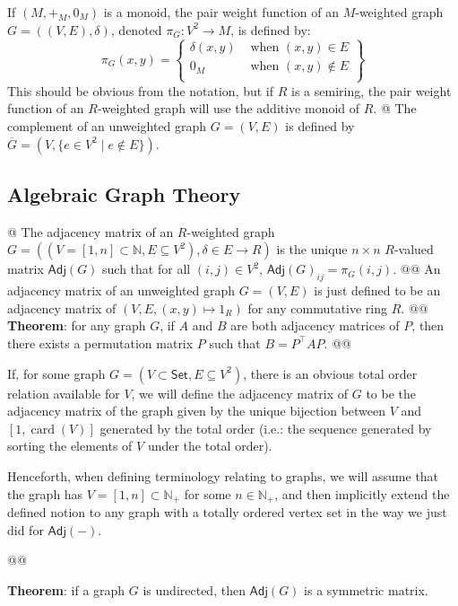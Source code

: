 \documentclass[]{article}
\newcommand{\textbs}[1]{{\sffamily\fontseries{sbc}\selectfont #1}}
\newcommand{\mbb}[1]{\ensuremath{\mathbb{#1}}}     %
\newcommand{\msf}[1]{\ensuremath{\mathsf{#1}}}     %
\newcommand{\catset}[0]{\ensuremath{\mathsf{Set}}}
\DeclareMathOperator{\card}{card}
\newcommand{\define}[1]{\textbs{#1}}
\begin{document}
\begin{refsection}
\begin{easylist}[itemize]
{  If $(M, {+}_M, 0_M)$ is a monoid, the \define{pair weight function} of
  an $M$-weighted graph $G = ((V, E), \delta)$, denoted $\pi_G : V^2 \to M$,
  is defined by:
  \begin{equation*}
  \pi_G(x, y) = \left\{\begin{array}{lr}
  \delta(x, y) & \text{ when } (x, y) \in    E \\
  0_M          & \text{ when } (x, y) \notin E \\
  \end{array}\right\}
  \end{equation*}
  This should be obvious from the notation, but if $R$ is a semiring, the pair
  weight function of an $R$-weighted graph will use the additive monoid of $R$.
}
@ {%
  The \define{complement} of an unweighted graph $G = (V, E)$
  is defined by $\overline{G} = (V, \{e \in V^2 \mid e \notin E\})$.
}
\end{easylist}

\subsection{Algebraic Graph Theory}

\begin{easylist}[itemize]
@ {%
  The \define{adjacency matrix} of an $R$-weighted graph
  $G = ((V = [1, n] \subset \mbb{N}, E \subseteq V^2), \delta \in E \to R)$
  is the unique $n \times n$ $R$-valued matrix $\msf{Adj}(G)$ such that for
  all $(i, j) \in V^2$, ${\msf{Adj}(G)}_{ij} = \pi_G(i, j)$.
}
@@ {%
  An adjacency matrix of an unweighted graph $G = (V, E)$ is just defined to be
  an adjacency matrix of $(V, E, (x, y) \mapsto 1_R)$ for any commutative
  ring $R$.
}
@@ {%
  \textbf{Theorem}: for any graph $G$, if $A$ and $B$ are both adjacency
  matrices of $P$, then there exists a permutation matrix $P$ such that
  $B = P^\top A P$.
}
@@ {%
  If, for some graph $G = (V \subset \catset, E \subseteq V^2)$, there is an
  obvious total order relation available for $V$, we will define the adjacency
  matrix of $G$ to be the adjacency matrix of the graph given by the unique
  bijection between $V$ and $[1, \card(V)]$ generated by the total order
  (i.e.: the sequence generated by sorting the elements of $V$ under the
  total order).

  Henceforth, when defining terminology relating to graphs, we will assume that
  the graph has $V = [1, n] \subset \mbb{N}_{+}$ for some $n \in \mbb{N}_{+}$,
  and then implicitly extend the defined notion to any graph with a totally
  ordered vertex set in the way we just did for $\msf{Adj}(-)$.
}
@@ {%
  \textbf{Theorem}:
  if a graph $G$ is undirected, then $\msf{Adj}(G)$ is a symmetric matrix.

}
\end{easylist}
\end{refsection}
\end{document}
